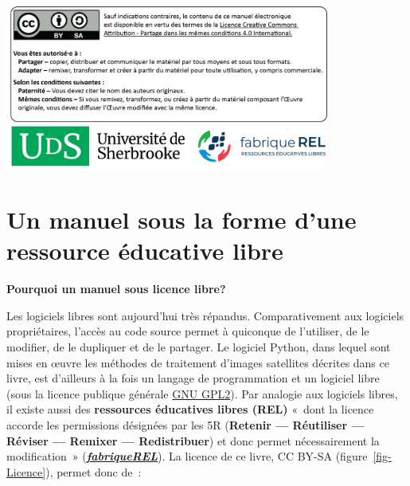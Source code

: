 \documentclass[
  letterpaper,
  DIV=11,
  numbers=noendperiod]{scrreprt}
\begin{document}
\includegraphics[width=0.8\textwidth,height=\textheight]{images/introduction/CouvertureP2.png}\hfill

\section*{Un manuel sous la forme d'une ressource éducative
libre}\label{sect001}


\textbf{Pourquoi un manuel sous licence libre?}

Les logiciels libres sont aujourd'hui très répandus. Comparativement aux
logiciels propriétaires, l'accès au code source permet à quiconque de
l'utiliser, de le modifier, de le dupliquer et de le partager. Le
logiciel Python, dans lequel sont mises en œuvre les méthodes de
traitement d'images satellites décrites dans ce livre, est d'ailleurs à
la fois un langage de programmation et un logiciel libre (sous la
licence publique générale
\href{https://fr.wikipedia.org/wiki/Licence_publique_g\%C3\%A9n\%C3\%A9rale_GNU}{GNU
GPL2}). Par analogie aux logiciels libres, il existe aussi des
\textbf{ressources éducatives libres (REL)} «~dont la licence accorde
les permissions désignées par les 5R (\textbf{Retenir --- Réutiliser ---
Réviser --- Remixer --- Redistribuer}) et donc permet nécessairement la
modification~»
(\href{https://fabriquerel.org/rel/}{\textbf{\emph{fabriqueREL}}}). La
licence de ce livre, CC BY-SA (figure~\ref{fig-Licence}), permet donc
de~:
\end{document}
